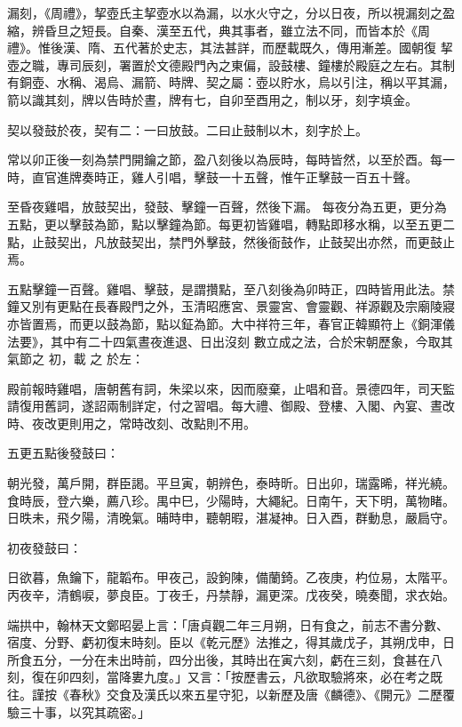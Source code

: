 \begin{pinyinscope}
 漏刻，《周禮》，挈壺氏主挈壺水以為漏，以水火守之，分以日夜，所以視漏刻之盈縮，辨昏旦之短長。自秦、漢至五代，典其事者，雖立法不同，而皆本於《周禮》。惟後漢、隋、五代著於史志，其法甚詳，而歷載既久，傳用漸差。國朝復
 挈壺之職，專司辰刻，署置於文德殿門內之東偏，設鼓樓、鐘樓於殿庭之左右。其制有銅壺、水稱、渴烏、漏箭、時牌、契之屬：壺以貯水，烏以引注，稱以平其漏，箭以識其刻，牌以告時於晝，牌有七，自卯至酉用之，制以牙，刻字填金。



 契以發鼓於夜，契有二：一曰放鼓。二曰止鼓制以木，刻字於上。



 常以卯正後一刻為禁門開鑰之節，盈八刻後以為辰時，每時皆然，以至於酉。每一時，直官進牌奏時正，雞人引唱，擊鼓一十五聲，惟午正擊鼓一百五十聲。



 至昏夜雞唱，放鼓契出，發鼓、擊鐘一百聲，然後下漏。
 每夜分為五更，更分為五點，更以擊鼓為節，點以擊鐘為節。每更初皆雞唱，轉點即移水稱，以至五更二點，止鼓契出，凡放鼓契出，禁門外擊鼓，然後衙鼓作，止鼓契出亦然，而更鼓止焉。



 五點擊鐘一百聲。雞唱、擊鼓，是謂攢點，至八刻後為卯時正，四時皆用此法。禁鐘又別有更點在長春殿門之外，玉清昭應宮、景靈宮、會靈觀、祥源觀及宗廟陵寢亦皆置焉，而更以鼓為節，點以鉦為節。大中祥符三年，春官正韓顯符上《銅渾儀法要》，其中有二十四氣晝夜進退、日出沒刻
 數立成之法，合於宋朝歷象，今取其氣節之
 初，載
 之
 於左：



 殿前報時雞唱，唐朝舊有詞，朱梁以來，因而廢棄，止唱和音。景德四年，司天監請復用舊詞，遂詔兩制詳定，付之習唱。每大禮、御殿、登樓、入閣、內宴、晝改時、夜改更則用之，常時改刻、改點則不用。



 五更五點後發鼓曰：



 朝光發，萬戶開，群臣謁。平旦寅，朝辨色，泰時昕。日出卯，瑞露晞，祥光繞。食時辰，登六樂，薦八珍。禺中巳，少陽時，大繩紀。日南午，天下明，萬物睹。日昳未，飛夕陽，清晚氣。晡時申，聽朝暇，湛凝神。日入酉，群動息，嚴扃守。



 初夜發鼓曰：



 日欲暮，魚鑰下，龍韜布。甲夜己，設鉤陳，備蘭錡。乙夜庚，杓位易，太階平。丙夜辛，清鶴唳，夢良臣。丁夜壬，丹禁靜，漏更深。戊夜癸，曉奏聞，求衣始。



 端拱中，翰林天文鄭昭晏上言：「唐貞觀二年三月朔，日有食之，前志不書分數、宿度、分野、虧初復末時刻。臣以《乾元歷》法推之，得其歲戊子，其朔戊申，日所食五分，一分在未出時前，四分出後，其時出在寅六刻，虧在三刻，食甚在八刻，復在卯四刻，當降婁九度。」又言：「按歷書云，凡欲取驗將來，必在考之既往。謹按《春秋》交食及漢氏以來五星守犯，以新歷及唐《麟德》、《開元》二歷覆驗三十事，以究其疏密。」




\end{pinyinscope}
